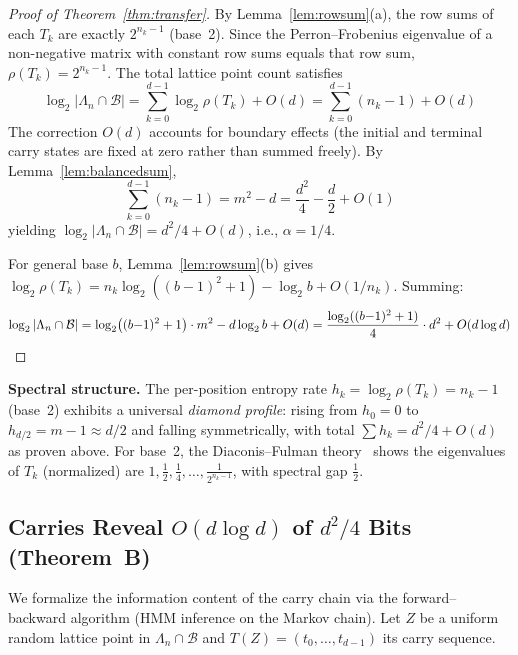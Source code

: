 \documentclass[11pt,a4paper]{article}
\begin{document}
\begin{proof}[Proof of Theorem~\ref{thm:transfer}]
By Lemma~\ref{lem:rowsum}(a), the row sums of each $T_k$ are exactly $2^{n_k - 1}$ (base~2).  Since the Perron--Frobenius eigenvalue of a non-negative matrix with constant row sums equals that row sum, $\rho(T_k) = 2^{n_k - 1}$.  The total lattice point count satisfies
\[
\log_2 |\Lambda_n \cap \mathcal{B}| = \sum_{k=0}^{d-1} \log_2 \rho(T_k) + O(d) = \sum_{k=0}^{d-1} (n_k - 1) + O(d)
\]
The correction $O(d)$ accounts for boundary effects (the initial and terminal carry states are fixed at zero rather than summed freely).  By Lemma~\ref{lem:balancedsum},
\[
\sum_{k=0}^{d-1} (n_k - 1) = m^2 - d = \frac{d^2}{4} - \frac{d}{2} + O(1)
\]
yielding $\log_2|\Lambda_n \cap \mathcal{B}| = d^2/4 + O(d)$, i.e., $\alpha = 1/4$.

For general base $b$, Lemma~\ref{lem:rowsum}(b) gives $\log_2 \rho(T_k) = n_k \log_2((b{-}1)^2 + 1) - \log_2 b + O(1/n_k)$.  Summing:
\[
\log_2 |\Lambda_n \cap \mathcal{B}| = \log_2\bigl((b{-}1)^2 + 1\bigr) \cdot m^2 - d\log_2 b + O(d) = \frac{\log_2((b{-}1)^2 + 1)}{4} \cdot d^2 + O(d \log d) \qedhere
\]
\end{proof}

\textbf{Spectral structure.}  The per-position entropy rate $h_k = \log_2 \rho(T_k) = n_k - 1$ (base~2) exhibits a universal \emph{diamond profile}: rising from $h_0 = 0$ to $h_{d/2} = m - 1 \approx d/2$ and falling symmetrically, with total $\sum h_k = d^2/4 + O(d)$ as proven above.  For base~2, the Diaconis--Fulman theory~\cite{diaconis09} shows the eigenvalues of $T_k$ (normalized) are $1, \tfrac{1}{2}, \tfrac{1}{4}, \ldots, \tfrac{1}{2^{n_k-1}}$, with spectral gap $\tfrac{1}{2}$.

\subsection{Carries Reveal $O(d \log d)$ of $d^2/4$ Bits (Theorem~B)}

We formalize the information content of the carry chain via the forward--backward algorithm (HMM inference on the Markov chain).  Let $Z$ be a uniform random lattice point in $\Lambda_n \cap \mathcal{B}$ and $T(Z) = (t_0, \ldots, t_{d-1})$ its carry sequence.
\end{document}

